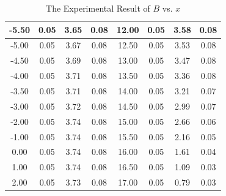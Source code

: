 \documentclass[a4paper]{article}
\begin{document}
\begin{table}[H]
\begin{tabular}{|c|c|c|c||c|c|c|c|}
            -5.50&0.05&3.65&0.08&12.00&0.05&3.58&0.08\\\hline
            -5.00&0.05&3.67&0.08&12.50&0.05&3.53&0.08\\\hline
            -4.50&0.05&3.69&0.08&13.00&0.05&3.47&0.08\\\hline
            -4.00&0.05&3.71&0.08&13.50&0.05&3.36&0.08\\\hline
            -3.50&0.05&3.71&0.08&14.00&0.05&3.21&0.07\\\hline
            -3.00&0.05&3.72&0.08&14.50&0.05&2.99&0.07\\\hline
            -2.00&0.05&3.74&0.08&15.00&0.05&2.66&0.06\\\hline
            -1.00&0.05&3.74&0.08&15.50&0.05&2.16&0.05\\\hline
            0.00&0.05&3.74&0.08&16.00&0.05&1.61&0.04\\\hline
            1.00&0.05&3.74&0.08&16.50&0.05&1.09&0.03\\\hline
            2.00&0.05&3.73&0.08&17.00&0.05&0.79&0.03\\\hline
        \end{tabular}
        \caption{The Experimental Result of $B$ vs. $x$}
        \label{tab:exp}
    \end{table}
\end{document}
